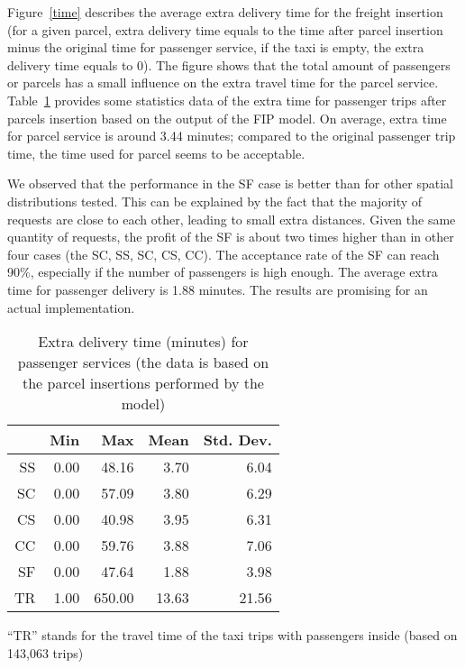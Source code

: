 \documentclass[preprint,authoryear,12pt]{elsarticle}
\begin{document}
Figure~\ref{time} describes the average extra delivery time for the freight insertion (for a given parcel, extra delivery time equals to the time after parcel insertion minus the original time for passenger service, if the taxi is empty, the extra delivery time equals to 0). The figure shows that the total amount of passengers or parcels has a small influence on the extra travel time for the parcel service.  Table~\ref{parceltime} provides some statistics data of the extra time for passenger trips after parcels insertion based on the output of the FIP model. On average, extra time for parcel service is around 3.44 minutes; compared to the original passenger trip time, the time used for parcel seems to be acceptable.

We observed that the performance in the SF case is better than for other spatial distributions tested. This can be explained by the fact that the majority of requests are close to each other, leading to small extra distances. Given the same quantity of requests, the profit of the SF is about two times higher than in other four cases (the SC, SS, SC, CS, CC). The acceptance rate of the SF can reach 90\%, especially if the number of passengers is high enough. The average extra time for passenger delivery is 1.88 minutes. The results are promising for an actual implementation.

\begin{table} [!htbp]
\caption{Extra delivery time (minutes) for passenger services (the data is based on the parcel insertions performed by the model)}
\vspace{-1em}
\begin{center}
\small
\begin{tabular}{r r r r r }
\hline
&Min&Max&Mean&Std. Dev.\\
\hline
SS&0.00&48.16&3.70&6.04\\
SC&0.00&57.09&3.80&6.29\\
CS&0.00&40.98&3.95&6.31\\
CC&0.00&59.76&3.88&7.06\\
SF&0.00&47.64&1.88&3.98\\
\hline
TR &1.00&650.00&13.63&21.56\\
\hline
\end{tabular}
\end{center}
\small
\footnotesize{``TR'' stands for the travel time of the taxi trips with passengers inside (based on 143,063 trips)}

\label{parceltime}
\end{table}
\end{document}
